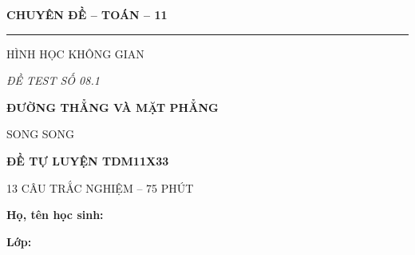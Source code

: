 \documentclass[12pt,a4paper]{article}
\begin{document}
\noindent
\begin{minipage}[t]{.35\textwidth}
  \centering
  {\bfseries CHUYÊN ĐỀ -- TOÁN -- 11\par}
  \vspace{2pt}\rule{.72\linewidth}{.4pt}\par\vspace{3pt}
  HÌNH HỌC KHÔNG GIAN\par\vspace{4pt}
  {\itshape ĐỀ TEST SỐ 08.1\par}
\end{minipage}\hfill
\begin{minipage}[t]{.62\textwidth}
  \centering
  {\bfseries ĐƯỜNG THẲNG VÀ MẶT PHẲNG\par
  SONG SONG\par}
  \vspace{5pt}
  {\small\bfseries ĐỀ TỰ LUYỆN TDM11X33\par
  13 CÂU TRẮC NGHIỆM -- 75 PHÚT\par}
\end{minipage}
\vspace{4mm}
\noindent
\begin{minipage}[t]{.72\textwidth}
  \textbf{Họ, tên học sinh:}\dotfill\par
  \vspace{3pt}
  \textbf{Lớp:}\dotfill
\end{minipage}\hfill
\begin{minipage}[t]{.25\textwidth}
  \raggedleft\setlength{\fboxsep}{4pt}
\end{minipage}
\end{document}

